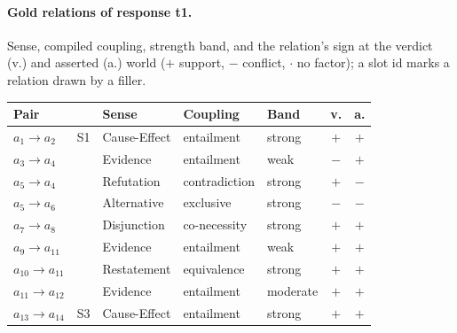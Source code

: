 \paragraph{Gold relations of response t1.} Sense, compiled coupling, strength band, and the relation's sign at the verdict (v.) and asserted (a.) world ($+$ support, $-$ conflict, $\cdot$ no factor); a slot id marks a relation drawn by a filler.

\begin{center}\scriptsize
\setlength{\tabcolsep}{2.2pt}
\begin{tabular}{@{}lllllcc@{}}
\toprule
Pair & & Sense & Coupling & Band & v. & a. \\
\midrule
$a_{1}\to a_{2}$ & S1 & Cause-Effect & entailment & strong & $+$ & $+$ \\
$a_{3}\to a_{4}$ &  & Evidence & entailment & weak & $-$ & $+$ \\
$a_{5}\to a_{4}$ &  & Refutation & contradiction & strong & $+$ & $-$ \\
$a_{5}\to a_{6}$ &  & Alternative & exclusive & strong & $-$ & $-$ \\
$a_{7}\to a_{8}$ &  & Disjunction & co-necessity & strong & $+$ & $+$ \\
$a_{9}\to a_{11}$ &  & Evidence & entailment & weak & $+$ & $+$ \\
$a_{10}\to a_{11}$ &  & Restatement & equivalence & strong & $+$ & $+$ \\
$a_{11}\to a_{12}$ &  & Evidence & entailment & moderate & $+$ & $+$ \\
$a_{13}\to a_{14}$ & S3 & Cause-Effect & entailment & strong & $+$ & $+$ \\
\bottomrule
\end{tabular}
\end{center}
